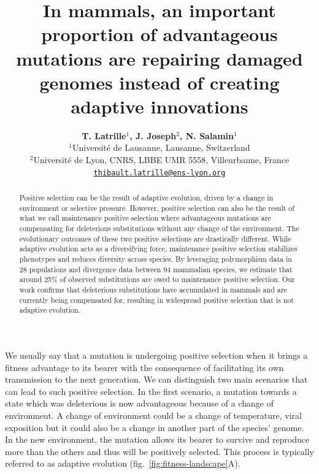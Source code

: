 \documentclass{article}
\title{In mammals, an important proportion of advantageous mutations are repairing damaged genomes instead of creating adaptive innovations}
\author{
    \large
    \textbf{T. {Latrille}$^{1}$, J. {Joseph}$^{2}$, N. {Salamin}$^{1}$}\\
    \normalsize
    $^{1}$Université de Lausanne, Lausanne, Switzerland\\
    $^{2}$Université de Lyon, CNRS, LBBE UMR 5558, Villeurbanne, France \\
    \texttt{\href{mailto:thibault.latrille@ens-lyon.org}{thibault.latrille@ens-lyon.org}} \\
}
\newcommand{\NS}[1]{\textcolor{red}{\textbf{\emph{[NS: #1]}}}}
\begin{document}
    \maketitle

    \begin{abstract}
        Positive selection can be the result of adaptive evolution, driven by a change in environment or selective pressure.
        However, positive selection can also be the result of what we call maintenance positive selection where advantageous mutations are compensating for deleterious substitutions without any change of the environment.
        The evolutionary outcomes of these two positive selections are drastically different.
        While adaptive evolution acts as a diversifying force, maintenance positive selection stabilizes phenotypes and reduces diversity across species.
        By leveraging polymorphism data in 28 populations and divergence data between 94 mammalian species, we estimate that around 25\% of observed substitutions are owed to maintenance positive selection.
        Our work confirms that deleterious substitutions have accumulated in mammals and are currently being compensated for, resulting in widespread positive selection that is not adaptive evolution.
    \end{abstract}


    We usually say that a mutation is undergoing positive selection when it brings a fitness advantage to its bearer with the consequence of facilitating its own transmission to the next generation.
    We can distinguish two main scenarios that can lead to such positive selection.
    In the first scenario, a mutation towards a state which was deleterious is now advantageous because of a change of environment.
    A change of environment could be a change of temperature, viral exposition but it could also be a change in another part of the species' genome.
    In the new environment, the mutation allows its bearer to survive and reproduce more than the others and thus will be positively selected.
    This process is typically referred to as adaptive evolution (fig.~\ref{fig:fitness-landscape}A).
\end{document}
